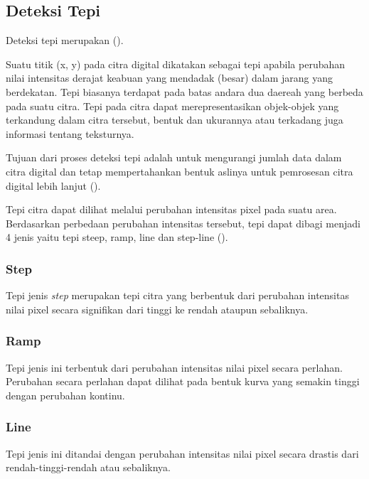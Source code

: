 \subsection{Deteksi Tepi}
Deteksi tepi merupakan (\cite{desi_herawati}).

Suatu titik (x, y) pada citra digital dikatakan sebagai tepi apabila perubahan nilai intensitas derajat keabuan yang mendadak (besar) dalam jarang yang berdekatan. Tepi biasanya terdapat pada batas andara dua daereah yang berbeda pada suatu citra. Tepi pada citra dapat merepresentasikan objek-objek yang terkandung dalam citra tersebut, bentuk dan ukurannya atau terkadang juga informasi tentang teksturnya.

Tujuan dari proses deteksi tepi adalah untuk mengurangi jumlah data dalam citra digital dan tetap mempertahankan bentuk aslinya untuk pemrosesan citra digital lebih lanjut (\cite{rashmi}).

Tepi citra dapat dilihat melalui perubahan intensitas pixel pada suatu area. Berdasarkan perbedaan perubahan intensitas tersebut, tepi dapat dibagi menjadi 4 jenis yaitu tepi steep, ramp, line dan step-line (\cite{book:darma}).

\subsubsection{Step}
Tepi jenis \textit{step} merupakan tepi citra yang berbentuk dari perubahan intensitas nilai pixel secara signifikan dari tinggi ke rendah ataupun sebaliknya.


\subsubsection{Ramp}
Tepi jenis ini terbentuk dari perubahan intensitas nilai pixel secara perlahan. Perubahan secara perlahan dapat dilihat pada bentuk kurva yang semakin tinggi dengan perubahan kontinu.

\subsubsection{Line}
Tepi jenis ini ditandai dengan perubahan intensitas nilai pixel secara drastis dari rendah-tinggi-rendah atau sebaliknya.

